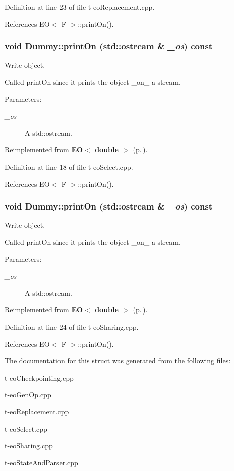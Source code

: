 Definition at line 23 of file t-eo\-Replacement.cpp.

References EO$<$ F $>$::print\-On().
\subsubsection{\setlength{\rightskip}{0pt plus 5cm}void Dummy::print\-On (std::ostream \& {\em \_\-os}) const\hspace{0.3cm}{\tt  [inline, virtual]}}\label{struct_dummy_a3}


Write object. 

Called print\-On since it prints the object \_\-on\_\- a stream. \begin{Desc}
\item[Parameters:]
\begin{description}
\item[{\em \_\-os}]A std::ostream. \end{description}
\end{Desc}


Reimplemented from {\bf EO$<$ double $>$} {\rm (p.\,\pageref{class_e_o_z10_2})}.

Definition at line 18 of file t-eo\-Select.cpp.

References EO$<$ F $>$::print\-On().
\subsubsection{\setlength{\rightskip}{0pt plus 5cm}void Dummy::print\-On (std::ostream \& {\em \_\-os}) const\hspace{0.3cm}{\tt  [inline, virtual]}}\label{struct_dummy_a4}


Write object. 

Called print\-On since it prints the object \_\-on\_\- a stream. \begin{Desc}
\item[Parameters:]
\begin{description}
\item[{\em \_\-os}]A std::ostream. \end{description}
\end{Desc}


Reimplemented from {\bf EO$<$ double $>$} {\rm (p.\,\pageref{class_e_o_z10_2})}.

Definition at line 24 of file t-eo\-Sharing.cpp.

References EO$<$ F $>$::print\-On().

The documentation for this struct was generated from the following files:\begin{CompactItemize}
\item 
t-eo\-Checkpointing.cpp\item 
t-eo\-Gen\-Op.cpp\item 
t-eo\-Replacement.cpp\item 
t-eo\-Select.cpp\item 
t-eo\-Sharing.cpp\item 
t-eo\-State\-And\-Parser.cpp\end{CompactItemize}
